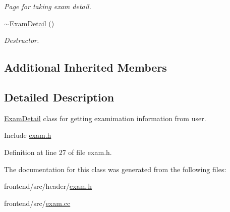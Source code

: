 \begin{DoxyCompactItemize}
\begin{DoxyCompactList}\small\item\em Page for taking exam detail. \end{DoxyCompactList}\item 
\hypertarget{classExamDetail_ac613efeb54bd3ddc025b6665e23eb3b0}{\hyperlink{classExamDetail_ac613efeb54bd3ddc025b6665e23eb3b0}{$\sim$\-Exam\-Detail} ()}\label{classExamDetail_ac613efeb54bd3ddc025b6665e23eb3b0}

\begin{DoxyCompactList}\small\item\em Destructor. \end{DoxyCompactList}\end{DoxyCompactItemize}
\subsection*{Additional Inherited Members}


\subsection{Detailed Description}
\hyperlink{classExamDetail}{Exam\-Detail} class for getting examimation information from user. 

Include \hyperlink{exam_8h}{exam.\-h} 

Definition at line 27 of file exam.\-h.



The documentation for this class was generated from the following files\-:\begin{DoxyCompactItemize}
\item 
frontend/src/header/\hyperlink{exam_8h}{exam.\-h}\item 
frontend/src/\hyperlink{exam_8cc}{exam.\-cc}\end{DoxyCompactItemize}
